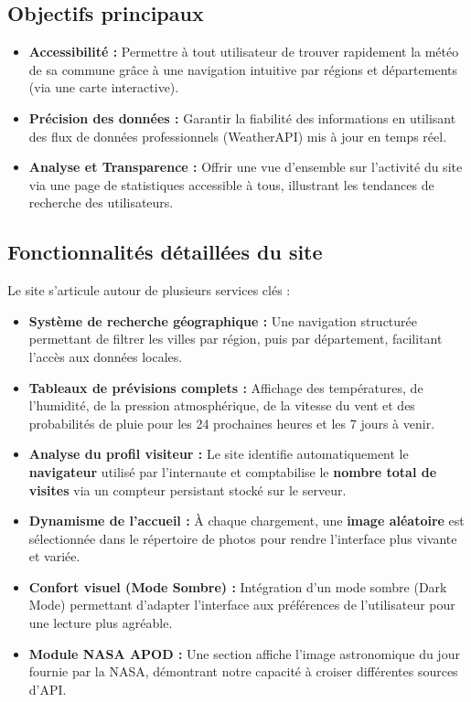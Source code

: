 \documentclass[12pt,a4paper]{article}
\begin{document}
\subsection{Objectifs principaux}
\begin{itemize}
    \item \textbf{Accessibilité :} Permettre à tout utilisateur de trouver rapidement la météo de sa commune grâce à une navigation intuitive par régions et départements (via une carte interactive).
    \item \textbf{Précision des données :} Garantir la fiabilité des informations en utilisant des flux de données professionnels (WeatherAPI) mis à jour en temps réel.
    \item \textbf{Analyse et Transparence :} Offrir une vue d'ensemble sur l'activité du site via une page de statistiques accessible à tous, illustrant les tendances de recherche des utilisateurs.
\end{itemize}

\subsection{Fonctionnalités détaillées du site}
Le site s'articule autour de plusieurs services clés :
\begin{itemize}
    \item \textbf{Système de recherche géographique :} Une navigation structurée permettant de filtrer les villes par région, puis par département, facilitant l'accès aux données locales.
    \item \textbf{Tableaux de prévisions complets :} Affichage des températures, de l'humidité, de la pression atmosphérique, de la vitesse du vent et des probabilités de pluie pour les 24 prochaines heures et les 7 jours à venir.
    \item \textbf{Analyse du profil visiteur :} Le site identifie automatiquement le \textbf{navigateur} utilisé par l'internaute et comptabilise le \textbf{nombre total de visites} via un compteur persistant stocké sur le serveur.
    \item \textbf{Dynamisme de l'accueil :} À chaque chargement, une \textbf{image aléatoire} est sélectionnée dans le répertoire de photos pour rendre l'interface plus vivante et variée.
    \item \textbf{Confort visuel (Mode Sombre) :} Intégration d'un mode sombre (Dark Mode) permettant d'adapter l'interface aux préférences de l'utilisateur pour une lecture plus agréable.
    \item \textbf{Module NASA APOD :} Une section affiche l'image astronomique du jour fournie par la NASA, démontrant notre capacité à croiser différentes sources d'API.
\end{itemize}
\vfill
{} \par
\newpage
\end{document}
